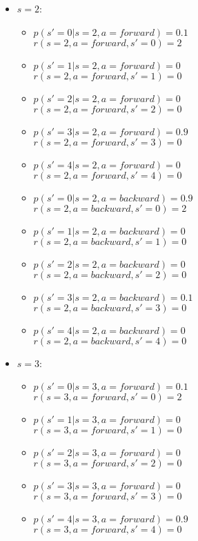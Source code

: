 \documentclass[english]{article}
\begin{document}
\begin{enumerate}
\begin{itemize}
\item $s = 2$: 
\begin{itemize}
\item $p(s' = 0 | s = 2, a = forward) = 0.1$   \\ 
$r(s = 2, a = forward, s' = 0) = 2$  
\item $p(s' = 1 | s = 2, a = forward) = 0$ \\ 
$r(s = 2, a = forward, s' = 1) = 0$
\item $p(s' = 2 | s = 2, a = forward) = 0$ \\ 
$r(s = 2, a = forward, s' = 2) = 0$
\item $p(s' = 3 | s = 2, a = forward) = 0.9$ \\ 
$r(s = 2, a = forward, s' = 3) = 0$
\item $p(s' = 4 | s = 2, a = forward) = 0$ \\
$r(s = 2, a = forward, s' = 4) = 0$

\item $p(s' = 0 | s = 2, a = backward) = 0.9$ \\ 
$r(s = 2, a = backward, s' = 0) = 2$ 
\item $p(s' = 1 | s = 2, a = backward) = 0$ \\
$r(s = 2, a = backward, s' = 1) = 0$ 
\item $p(s' = 2 | s = 2, a = backward) = 0$ \\
$r(s = 2, a = backward, s' = 2) = 0$ 
\item $p(s' = 3 | s = 2, a = backward) = 0.1$ \\
$r(s = 2, a = backward, s' = 3) = 0$ 
\item $p(s' = 4 | s = 2, a = backward) = 0$ \\
$r(s = 2, a = backward, s' = 4) = 0$ 
\end{itemize}

\item $s = 3$: 
\begin{itemize}
\item $p(s' = 0 | s = 3, a = forward) = 0.1$   \\ 
$r(s = 3, a = forward, s' = 0) = 2$  
\item $p(s' = 1 | s = 3, a = forward) = 0$ \\ 
$r(s = 3, a = forward, s' = 1) = 0$
\item $p(s' = 2 | s = 3, a = forward) = 0$ \\ 
$r(s = 3, a = forward, s' = 2) = 0$
\item $p(s' = 3 | s = 3, a = forward) = 0$ \\ 
$r(s = 3, a = forward, s' = 3) = 0$
\item $p(s' = 4 | s = 3, a = forward) = 0.9$ \\
$r(s = 3, a = forward, s' = 4) = 0$


\end{itemize}
\end{itemize}
\end{enumerate}
\end{document}
